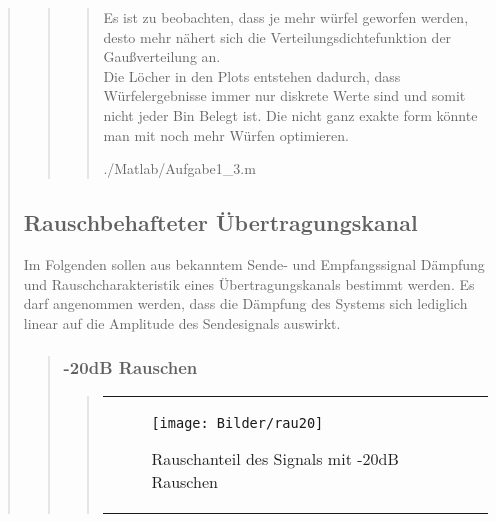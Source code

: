 \begin{quote}
\begin{quote}
        \begin{quote}
            

            
            Es ist zu beobachten, dass je mehr würfel geworfen werden, desto mehr nähert sich die Verteilungsdichtefunktion der
            Gaußverteilung an.\\
            Die Löcher in den Plots entstehen dadurch, dass Würfelergebnisse immer nur diskrete Werte sind und somit nicht jeder
            Bin Belegt ist. Die nicht ganz exakte form könnte man mit noch mehr Würfen optimieren.
            
            
            
                {./Matlab/Aufgabe1_3.m}
            
        \end{quote}
        
        
    \end{quote}

    \subsection{Rauschbehafteter Übertragungskanal}
    
    Im Folgenden sollen aus bekanntem Sende- und Empfangssignal Dämpfung und Rauschcharakteristik
    eines Übertragungskanals bestimmt werden. Es darf angenommen werden, dass die Dämpfung des
    Systems sich lediglich linear auf die Amplitude des Sendesignals auswirkt.
    
    \begin{quote}
        
        \subsubsection{-20dB Rauschen}
        \begin{quote}
            
            
        \begin{center}
        \begin{tabular}{ll}
        
        \hspace{-16.5em}
            \begin{minipage}{0.6\textwidth}
                
                \begin{figure}[H]
                    \label{fig:rau20}
                    \texttt{[image: Bilder/rau20]}
                    \caption{Rauschanteil des Signals mit -20dB Rauschen}
                \end{figure}
        

\end{minipage}
\end{tabular}
\end{center}
\end{quote}
\end{quote}
\end{quote}
